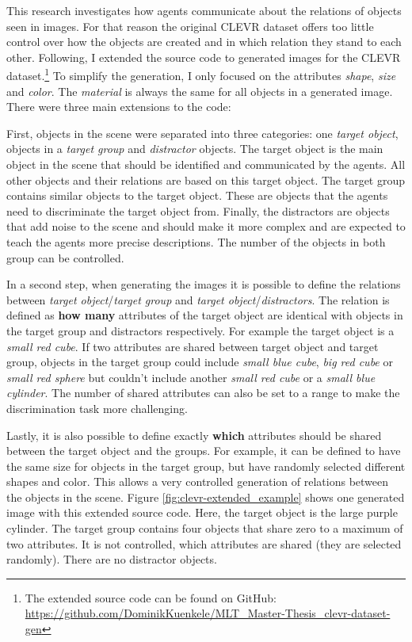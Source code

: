 
This research investigates how agents communicate about the relations of objects seen in images. For that reason the original CLEVR dataset offers too little control over how the objects are created and in which relation they stand to each other. Following, I extended the source code to generated images for the CLEVR dataset.\footnote{The extended source code can be found on GitHub: \href{https://github.com/DominikKuenkele/MLT\_Master-Thesis\_clevr-dataset-gen}{https://github.com/DominikKuenkele/MLT\_Master-Thesis\_clevr-dataset-gen}} To simplify the generation, I only focused on the attributes \emph{shape}, \emph{size} and \emph{color}. The \emph{material} is always the same for all objects in a generated image. There were three main extensions to the code:

First, objects in the scene were separated into three categories: one \emph{target object}, objects in a \emph{target group} and \emph{distractor} objects. The target object is the main object in the scene that should be identified and communicated by the agents. All other objects and their relations are based on this target object. The target group contains similar objects to the target object. These are objects that the agents need to discriminate the target object from. Finally, the distractors are objects that add noise to the scene and should make it more complex and are expected to teach the agents more precise descriptions. The number of the objects in both group can be controlled.

In a second step, when generating the images it is possible to define the relations between \emph{target object}/\emph{target group} and \emph{target object}/\emph{distractors}. The relation is defined as \textbf{how many} attributes of the target object are identical with objects in the target group and distractors respectively. For example the target object is a \emph{small red cube}. If two attributes are shared between target object and target group, objects in the target group could include \emph{small blue cube}, \emph{big red cube} or \emph{small red sphere} but couldn't include another \emph{small red cube} or a \emph{small blue cylinder}. The number of shared attributes can also be set to a range to make the discrimination task more challenging.

Lastly, it is also possible to define exactly \textbf{which} attributes should be shared between the target object and the groups. For example, it can be defined to have the same size for objects in the target group, but have randomly selected different shapes and color. This allows a very controlled generation of relations between the objects in the scene. Figure \ref{fig:clevr-extended_example} shows one generated image with this extended source code. Here, the target object is the large purple cylinder. The target group contains four objects that share zero to a maximum of two attributes. It is not controlled, which attributes are shared (they are selected randomly). There are no distractor objects.

